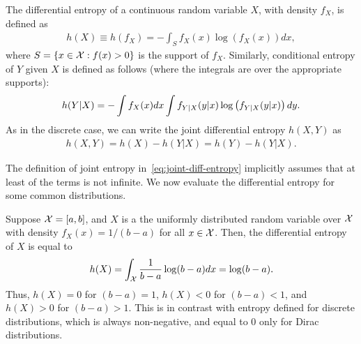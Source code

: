         \begin{definition}
            \label{def:diff-entropy}
            The differential entropy of a continuous random variable $X$, with density $f_X$, is defined as 
            \begin{align}
                h(X) \equiv h(f_X) = -\int_{S} f_X(x) \log(f_X(x)) dx, 
            \end{align}
            where $S = \{x \in \mathcal{X}: f(x) > 0\}$ is the support of $f_X$. 
            Similarly, conditional entropy of $Y$ given $X$ is defined as follows (where the integrals are over the appropriate supports): 
            \begin{align}
                h(Y|X) = -\int f_X(x) dx \int  f_{Y|X}(y|x) \log \left( f_{Y|X}(y|x) \right) dy. 
            \end{align}
            As in the discrete case, we can write the joint differential entropy $h(X, Y)$ as 
            \begin{align}
                h(X, Y) = h(X) - h(Y|X) = h(Y) - h(Y|X).  \label{eq:joint-diff-entropy}
            \end{align}
        \end{definition}
        The definition of joint entropy in~\eqref{eq:joint-diff-entropy} implicitly assumes that at least of the terms is not infinite.  We now evaluate the differential entropy for some common distributions.
        \begin{example}
            \label{example:diff-ent-uniform}
            Suppose $\mathcal{X} = [a, b]$, and $X$ is a the uniformly distributed random variable over $\mathcal{X}$ with density $f_X(x) = 1/(b-a)$ for all $x \in \mathcal{X}$. Then, the  differential entropy of $X$ is equal to 
            \begin{align}
                h(X) = \int_{\mathcal{X}} \frac{1}{b-a} \log(b-a) dx = \log(b-a). 
            \end{align}
            Thus, $h(X)=0$ for $(b-a)=1$, $h(X)<0$ for $(b-a)<1$, and $h(X)>0$ for $(b-a)>1$. This is in contrast with entropy defined for discrete distributions, which is always non-negative, and equal to $0$ only for Dirac distributions.  
        \end{example}

